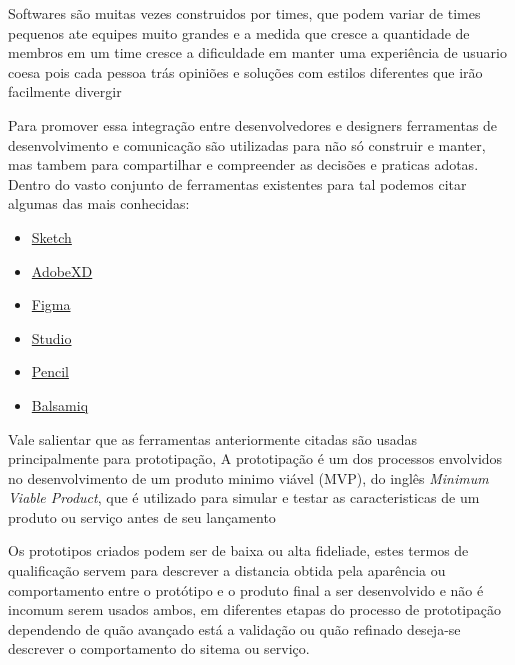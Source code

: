   Softwares são muitas vezes construidos por times, que podem variar de times pequenos ate equipes muito grandes e a medida que cresce a quantidade de membros em um time cresce a dificuldade em manter uma experiência de usuario coesa pois cada pessoa trás opiniões e soluções com estilos diferentes que irão facilmente divergir \cite{airbnb_medium}

  Para promover essa integração entre desenvolvedores e designers ferramentas de desenvolvimento e comunicação são utilizadas para não só construir e manter, mas tambem para compartilhar e compreender as decisões e praticas adotas. Dentro do vasto conjunto de ferramentas existentes para tal podemos citar algumas das mais conhecidas:

\begin{itemize}
  \item \href{https://www.sketch.com}{Sketch}
  \item \href{https://www.adobe.com/br/products/xd.html?promoid=3NQZBBTZ&mv=other}{AdobeXD}
  \item \href{https://www.figma.com/}{Figma}
  \item \href{https://www.invisionapp.com/studio}{Studio}
  \item \href{https://pencil.evolus.vn/}{Pencil}
  \item \href{https://balsamiq.com/wireframes/}{Balsamiq}
\end{itemize}

  Vale salientar que as ferramentas anteriormente citadas são usadas principalmente para prototipação, A prototipação é um dos processos envolvidos no desenvolvimento de um produto minimo viável (MVP), do inglês \textit{Minimum Viable Product}, que é utilizado para simular e testar as caracteristicas de um produto ou serviço antes de seu lançamento \cite{voitto}

  Os prototipos criados podem ser de baixa ou alta fideliade, estes termos de qualificação servem para descrever a distancia obtida pela aparência ou comportamento entre o protótipo e o produto final a ser desenvolvido e não é incomum serem usados ambos, em diferentes etapas do processo de prototipação dependendo de quão avançado está a validação ou quão refinado deseja-se descrever o comportamento do sitema ou serviço.

